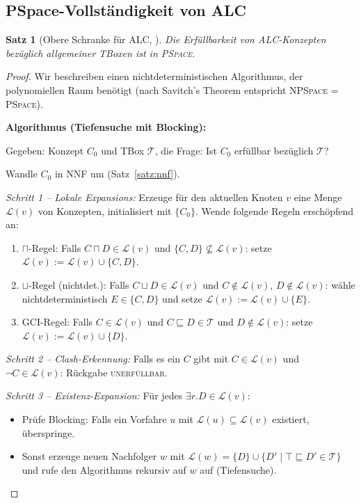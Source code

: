 ﻿\documentclass[a4paper,12pt]{article}
\theoremstyle{definition}
\theoremstyle{plain}
\newtheorem{satz}{Satz}[section]
\theoremstyle{remark}
\newcommand{\Tbox}{\ensuremath{\mathcal{T}}}
\begin{document}
\subsection{PSpace-Vollst{\"{a}}ndigkeit von ALC}
\label{sec:alc-kompl}

\begin{satz}[Obere Schranke f{\"{u}}r ALC, \cite{Schmidt1991}]
\label{satz:alc-pspace-upper}
Die Erf{\"{u}}llbarkeit von \textsf{ALC}-Konzepten bez{\"{u}}glich
allgemeiner TBoxen ist in \textsc{PSpace}.
\end{satz}

\begin{proof}
Wir beschreiben einen nichtdeterministischen Algorithmus,
der polynomiellen Raum ben{\"{o}}tigt (nach Savitch's Theorem
entspricht \textsc{NPSpace} = \textsc{PSpace}).

\textbf{Algorithmus (Tiefensuche mit Blocking):}

Gegeben: Konzept $C_0$ und TBox $\Tbox$,
die Frage: Ist $C_0$ erf{\"{u}}llbar bez{\"{u}}glich $\Tbox$?

Wandle $C_0$ in NNF um (Satz~\ref{satz:nnf}).

\textit{Schritt 1 -- Lokale Expansions:}
Erzeuge f{\"{u}}r den aktuellen Knoten $v$ eine Menge $\mathcal{L}(v)$
von Konzepten, initialisiert mit $\{C_0\}$.
Wende folgende Regeln ersch{\"{o}}pfend an:
\begin{enumerate}[label=(R\arabic*)]
  \item $\sqcap$-Regel: Falls $C \sqcap D \in \mathcal{L}(v)$
        und $\{C, D\} \not\subseteq \mathcal{L}(v)$:
        setze $\mathcal{L}(v) := \mathcal{L}(v) \cup \{C, D\}$.
  \item $\sqcup$-Regel (nichtdet.): Falls $C \sqcup D \in \mathcal{L}(v)$
        und $C \notin \mathcal{L}(v)$, $D \notin \mathcal{L}(v)$:
        w{\"{a}}hle nichtdeterministisch $E \in \{C, D\}$
        und setze $\mathcal{L}(v) := \mathcal{L}(v) \cup \{E\}$.
  \item GCI-Regel: Falls $C \in \mathcal{L}(v)$
        und $C \sqsubseteq D \in \Tbox$
        und $D \notin \mathcal{L}(v)$:
        setze $\mathcal{L}(v) := \mathcal{L}(v) \cup \{D\}$.
\end{enumerate}

\textit{Schritt 2 -- Clash-Erkennung:}
Falls es ein $C$ gibt mit $C \in \mathcal{L}(v)$ und
$\neg C \in \mathcal{L}(v)$: R{\"{u}}ckgabe \textsc{unerf{\"{u}}llbar}.

\textit{Schritt 3 -- Existenz-Expansion:}
F{\"{u}}r jedes $\exists r.D \in \mathcal{L}(v)$:
\begin{itemize}
  \item Pr{\"{u}}fe Blocking: Falls ein Vorfahre $u$ mit
        $\mathcal{L}(u) \subseteq \mathcal{L}(v)$ existiert,
        {\"{u}}berspringe.
  \item Sonst erzeuge neuen Nachfolger $w$ mit
        $\mathcal{L}(w) = \{D\} \cup \{D' \mid \top \sqsubseteq D' \in \Tbox\}$
        und rufe den Algorithmus rekursiv auf $w$ auf
        (Tiefensuche).
\end{itemize}


\end{proof}
\end{document}
